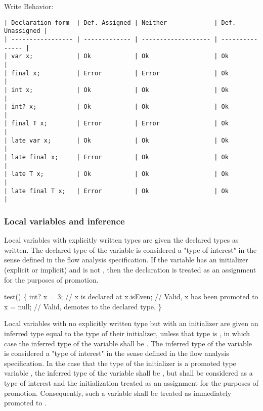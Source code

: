 \documentclass[makeidx]{article}
\begin{document}
{Write Behavior:

\begin{verbatim}
| Declaration form  | Def. Assigned | Neither             | Def. Unassigned |
| ----------------- | ------------- | ------------------- | --------------- |
| var x;            | Ok            | Ok                  | Ok              |
| final x;          | Error         | Error               | Ok              |
| int x;            | Ok            | Ok                  | Ok              |
| int? x;           | Ok            | Ok                  | Ok              |
| final T x;        | Error         | Error               | Ok              |
| late var x;       | Ok            | Ok                  | Ok              |
| late final x;     | Error         | Ok                  | Ok              |
| late T x;         | Ok            | Ok                  | Ok              |
| late final T x;   | Error         | Ok                  | Ok              |
\end{verbatim}

\subsubsection{Local variables and inference}

Local variables with explicitly written types are given the declared types as
written.  The declared type of the variable is considered a "type of interest"
in the sense defined in the flow analysis specification.  If the variable has an
initializer (explicit or implicit) and is not \FINAL, then the declaration is
treated as an assignment for the purposes of promotion.


\begin{dartCode}
\VOID test() \{
  int? x = 3; // x is declared at 
  x.isEven; // Valid, x has been promoted to 
  x = null; // Valid, demotes to the declared type.
\}
\end{dartCode}

Local variables with no explicitly written type but with an initializer are
given an inferred type equal to the type of their initializer, unless that type
is , in which case the inferred type of the variable shall be \DYNAMIC.
The inferred type of the variable is considered a "type of interest" in the
sense defined in the flow analysis specification.  In the case that the type of
the initializer is a promoted type variable , the inferred type of the
variable shall be , but  shall be considered as a type of interest and
the initialization treated as an assignment for the purposes of promotion.
Consequently, such a variable shall be treated as immediately promoted to .

}
\end{document}
